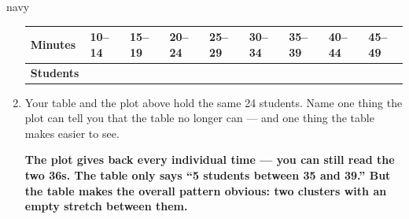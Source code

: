 \documentclass[12pt]{article}
\newcommand{\answerspace}[2]{\par\nopagebreak\noindent\begin{minipage}[t][#1][t]{\linewidth}%
  \color{keyred}\bfseries #2\end{minipage}\par}
\begin{document}
\begin{scenariobox}{navy}
\begin{enumerate}[label=\textbf{\alph*.}, leftmargin=1.8em, itemsep=6pt]
        \vspace{3pt}
        \renewcommand{\arraystretch}{1.3}
        \begin{tabularx}{\linewidth}{@{} l Y Y Y Y Y Y Y Y @{}}
        \textbf{Minutes} & 10--14 & 15--19 & 20--24 & 25--29 & 30--34 & 35--39 & 40--44 & 45--49 \\
        \hline
        \textbf{Students} &  &  &  &  &
         &  &  &  \\
        \end{tabularx}
  \item Your table and the plot above hold the same 24 students. Name one thing the plot can
        tell you that the table no longer can --- and one thing the table makes easier to see.
        \answerspace{2.0cm}{The plot gives back every individual time --- you can still read the
        two 36s. The table only says ``5 students between 35 and 39.'' But the table makes the
        overall pattern obvious: two clusters with an empty stretch between them.}
\end{enumerate}
\end{scenariobox}
\end{document}
